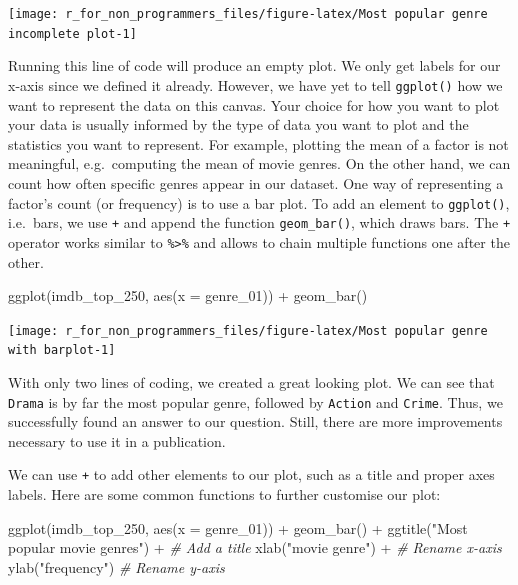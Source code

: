 \documentclass[
]{book}
\newenvironment{Shaded}{\begin{snugshade}}{\end{snugshade}}
\newcommand{\AttributeTok}[1]{\textcolor[rgb]{0.77,0.63,0.00}{#1}}
\newcommand{\CommentTok}[1]{\textcolor[rgb]{0.56,0.35,0.01}{\textit{#1}}}
\newcommand{\FunctionTok}[1]{\textcolor[rgb]{0.00,0.00,0.00}{#1}}
\newcommand{\NormalTok}[1]{#1}
\newcommand{\SpecialCharTok}[1]{\textcolor[rgb]{0.00,0.00,0.00}{#1}}
\newcommand{\StringTok}[1]{\textcolor[rgb]{0.31,0.60,0.02}{#1}}
\begin{document}
\begin{center}\texttt{[image: r\_for\_non\_programmers\_files/figure-latex/Most popular genre incomplete plot-1]} \end{center}

Running this line of code will produce an empty plot. We only get labels for our x-axis since we defined it already. However, we have yet to tell \texttt{ggplot()} how we want to represent the data on this canvas. Your choice for how you want to plot your data is usually informed by the type of data you want to plot and the statistics you want to represent. For example, plotting the mean of a factor is not meaningful, e.g.~computing the mean of movie genres. On the other hand, we can count how often specific genres appear in our dataset. One way of representing a factor's count (or frequency) is to use a bar plot. To add an element to \texttt{ggplot()}, i.e.~bars, we use \texttt{+} and append the function \texttt{geom\_bar()}, which draws bars. The \texttt{+} operator works similar to \texttt{\%\textgreater{}\%} and allows to chain multiple functions one after the other.

\begin{Shaded}
\begin{Highlighting}[]
\FunctionTok{ggplot}\NormalTok{(imdb\_top\_250, }\FunctionTok{aes}\NormalTok{(}\AttributeTok{x =}\NormalTok{ genre\_01)) }\SpecialCharTok{+}
  \FunctionTok{geom\_bar}\NormalTok{()}
\end{Highlighting}
\end{Shaded}

\begin{center}\texttt{[image: r\_for\_non\_programmers\_files/figure-latex/Most popular genre with barplot-1]} \end{center}

With only two lines of coding, we created a great looking plot. We can see that \texttt{Drama} is by far the most popular genre, followed by \texttt{Action} and \texttt{Crime}. Thus, we successfully found an answer to our question. Still, there are more improvements necessary to use it in a publication.

We can use \texttt{+} to add other elements to our plot, such as a title and proper axes labels. Here are some common functions to further customise our plot:

\begin{Shaded}
\begin{Highlighting}[]
\FunctionTok{ggplot}\NormalTok{(imdb\_top\_250, }\FunctionTok{aes}\NormalTok{(}\AttributeTok{x =}\NormalTok{ genre\_01)) }\SpecialCharTok{+}
  \FunctionTok{geom\_bar}\NormalTok{() }\SpecialCharTok{+}
  \FunctionTok{ggtitle}\NormalTok{(}\StringTok{"Most popular movie genres"}\NormalTok{) }\SpecialCharTok{+}  \CommentTok{\# Add a title}
  \FunctionTok{xlab}\NormalTok{(}\StringTok{"movie genre"}\NormalTok{) }\SpecialCharTok{+}                   \CommentTok{\# Rename x{-}axis}
  \FunctionTok{ylab}\NormalTok{(}\StringTok{"frequency"}\NormalTok{)                       }\CommentTok{\# Rename y{-}axis}
\end{Highlighting}
\end{Shaded}
\end{document}
